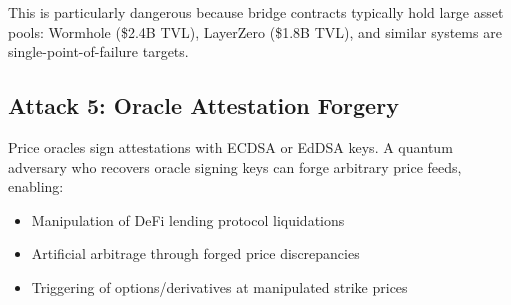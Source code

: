 This is particularly dangerous because bridge contracts typically hold large asset
pools: Wormhole (\$2.4B TVL), LayerZero (\$1.8B TVL), and similar systems are
single-point-of-failure targets.

\subsection{Attack 5: Oracle Attestation Forgery}

Price oracles sign attestations with ECDSA or EdDSA keys. A quantum adversary who
recovers oracle signing keys can forge arbitrary price feeds, enabling:

\begin{itemize}[leftmargin=2em]
  \item Manipulation of DeFi lending protocol liquidations
  \item Artificial arbitrage through forged price discrepancies
  \item Triggering of options/derivatives at manipulated strike prices
\end{itemize}

